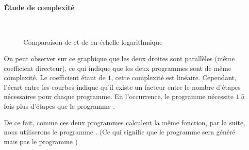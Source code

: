 \documentclass[a4paper, 11pt]{article}
\begin{document}
\begin{enumerate}
\paragraph{Étude de complexité} \mbox{} \\

\begin{minipage}{\linewidth}
    \begin{figure}[H]
            \begin{center}
            \end{center}
        \caption{Comparaison de \protect{} et de \protect{} en échelle logarithmique}
    \end{figure}
\end{minipage}


    On peut observer sur ce graphique que les deux droites sont parallèles (même coefficient directeur),
    ce qui indique que les deux programmes sont de même complexité. Le coefficient étant de $1$,
     cette complexité est linéaire. Cependant, l'écart entre les courbes indique qu'il existe un facteur
     entre le nombre d'étapes nécessaires pour chaque programme. En l'occurrence, le programme 
     nécessite $1.5$ fois plus d'étapes que le programme .

    De ce fait, comme ces deux programmes calculent la même fonction, par la suite, nous utiliserons 
    le programme . 
    (Ce qui signifie que le programme  sera généré mais pas le programme )


\end{enumerate}
\end{document}

